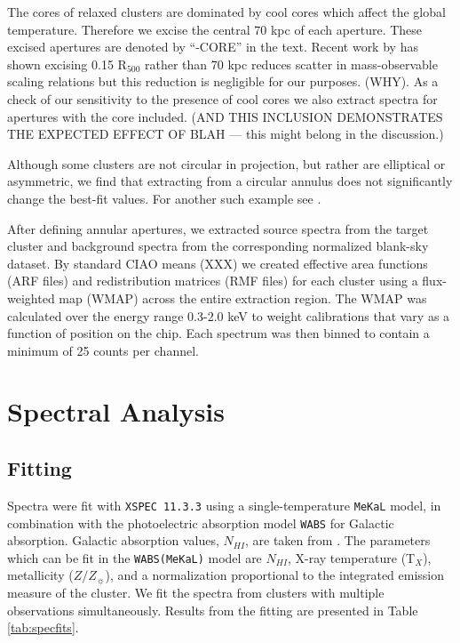 \documentclass{emulateapj}
\begin{document}
{The cores of relaxed clusters are dominated by cool cores which
affect the global temperature. Therefore we
excise the central 70 kpc of each aperture. 
These excised apertures are denoted by ``-CORE'' in the text. Recent work by
\cite{2007astro.ph..3504M} has shown excising 0.15 R$_{500}$ rather
than 70 kpc reduces scatter in mass-observable scaling relations but
this reduction is negligible for our purposes. (WHY). As a check of our
sensitivity to the presence of cool cores we also extract spectra for
apertures with the core included. (AND THIS INCLUSION DEMONSTRATES
THE EXPECTED EFFECT OF BLAH --- this might belong in the discussion.)

Although some clusters are not circular in projection, but rather are
elliptical or asymmetric, we find that extracting from a circular
annulus does not significantly change the best-fit values. For another
such example see \cite{2005MNRAS.359.1481B}.

After defining annular apertures, we extracted source spectra from the 
target cluster and background spectra from the corresponding
normalized blank-sky dataset. By standard CIAO means (XXX)
we created effective area
functions (ARF files) and redistribution matrices (RMF files) for each cluster
using a flux-weighted map (WMAP) across the entire extraction region. The
WMAP was calculated over the energy range 0.3-2.0 keV to 
weight calibrations that vary as a function of position on the
chip. Each spectrum was then binned to contain a minimum of 
25 counts per channel. 

\section{Spectral Analysis} \label{sec:specan}

\subsection{Fitting} \label{sec:fitting}

Spectra were fit with {\tt XSPEC 11.3.3}
\citep{1996ASPC..101...17A} using a single-temperature
{\tt MeKaL} model, in combination with the photoelectric
absorption model {\tt WABS} \citep{1983ApJ...270..119M} for Galactic
absorption. Galactic
absorption values, $N_{HI}$, are taken from
\cite{1990ARA&A..28..215D}. The parameters which can be fit in the
{\tt WABS(MeKaL)} model are $N_{HI}$, X-ray temperature (T$_{X}$), metallicity  
($Z/Z_{\sun}$), and a normalization proportional to the integrated emission measure
of the cluster.
We fit the spectra from clusters with multiple observations simultaneously.
Results from the fitting are presented in Table \ref{tab:specfits}.

}
\end{document}
